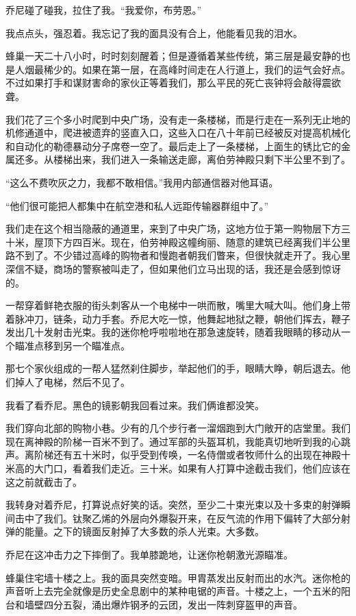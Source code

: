 \documentclass[AutoFakeBold=true]{book}
\begin{document}
乔尼碰了碰我，拉住了我。``我爱你，布劳恩。''

我点点头，强忍着。我忘记了我的面具没有合上，他能看见我的泪水。

蜂巢一天二十八小时，时时刻刻醒着；但是遵循着某些传统，第三层是最安静的也是人烟最稀少的。如果在第一层，在高峰时间走在人行道上，我们的运气会好点。不过如果打手和谋财害命的家伙正等着我们，那么平民的死亡丧钟将会敲得震欲聋。

我们花了三个多小时爬到中央广场，没有走一条楼梯，而是行走在一系列无止地的机修通道中，爬进被遗弃的竖直入口，这些入口在八十年前已经被反对提高机械化和自动化的勒德暴动分子席卷一空了。最后走上了一条楼梯，上面生的锈比它的金属还多。从楼梯出来，我们进入一条输送走廊，离伯劳神殿只剩下半公里不到了。

``这么不费吹灰之力，我都不敢相信。''我用内部通信器对他耳语。

``他们很可能把人都集中在航空港和私人远距传输器群组中了。''

我们走在这个相当隐蔽的通道里，来到了中央广场，这地方位于第一购物层下方三十米，屋顶下方四百米。现在，伯劳神殿这幢绚丽、随意的建筑已经离我们半公里路不到了。不少错过高峰的购物者和慢跑者朝我们瞥来，但很快就走开了。我心里深信不疑，商场的警察被叫走了，但如果他们立马出现的话，我还是会感到惊讶的。

一帮穿着鲜艳衣服的街头刺客从一个电梯中一哄而散，嘴里大喊大叫。他们身上带着脉冲刀，链条，动力手套。乔尼大吃一惊，他舞起地狱之鞭，朝他们挥去，鞭子发出几十发射击光束。我的迷你枪呼啦啦地在那急速旋转，随着我眼睛的移动从一个瞄准点移到另一个瞄准点。

那七个家伙组成的一帮人猛然刹住脚步，举起他们的手，眼睛大睁，朝后退去。他们掉人了电梯，然后不见了。

我看了看乔尼。黑色的镜影朝我回看过来。我们俩谁都没笑。

我们穿向北部的购物小巷。少有的几个步行者一溜烟跑到大门敞开的店堂里。我们现在离神殿的阶梯一百米不到了。通过军部的头盔耳机，我能真切地听到我的心跳声。离阶梯还有五十米时，似乎受到传唤，一名侍僧或者牧师什么的出现在神殿十米高的大门口，看着我们走近。三十米。如果有人打算中途截击我们，他们应该在这之前就截击了。

我转身对着乔尼，打算说点好笑的话。突然，至少二十束光束以及十多束的射弹瞬间击中了我们。钛聚乙烯的外层向外爆裂开来，在反气流的作用下偏转了大部分射弹的能量。之下的镜面反射掉了大多数的杀人光束。大多数。

乔尼在这冲击力之下摔倒了。我单膝跪地，让迷你枪朝激光源瞄准。

蜂巢住宅墙十楼之上。我的面具突然变暗。甲胄蒸发出反射而出的水汽。迷你枪的声音听上去完全就像是历史全息剧中的某种电锯的声音。十楼之上，一个五米的阳台和墙壁四分五裂，涌出爆炸钢矛的云团，发出一阵刺穿盔甲的声音。
\end{document}
